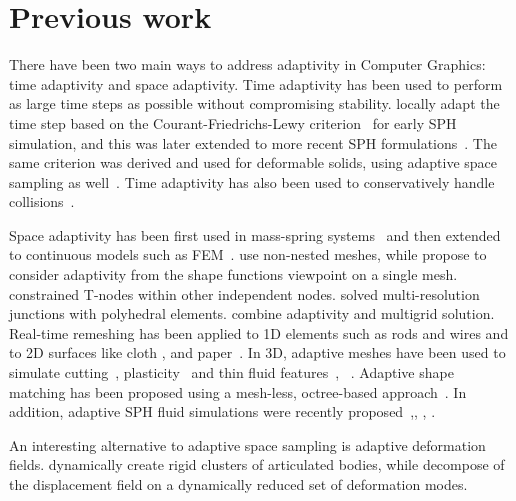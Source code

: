 \documentclass[11pt, oneside, a4paper]{memoir}
\begin{document}
\section{Previous work}
There have been two main ways to address adaptivity in Computer Graphics: time adaptivity and space adaptivity.
Time adaptivity has been used to perform as large time steps as possible without compromising stability. \cite{Desbrun:1996:SPN} locally adapt the time step based on the Courant-Friedrichs-Lewy criterion~\cite{Press:1992:NRC:148286} for early SPH simulation, and this was later extended to more recent SPH formulations~\cite{Bender_boundaryhandling}. The same criterion was derived and used for deformable solids, using adaptive space sampling as well~\cite{DDBC99,DDCB01}.
Time adaptivity has also been used to conservatively handle collisions~\cite{Harmon:2009:ACM}.

Space adaptivity has been first used in mass-spring systems~\cite{Hutchinson97AdaptiveMassspring,ganovelli99multires} and then extended to continuous models such as FEM~\cite{wu01adaptive}.
\cite{DDCB01} use non-nested meshes, while \cite{CHARMS} propose to consider adaptivity from the shape functions viewpoint on a single mesh. %
\cite{Sifakisy:hybrid:2007} constrained T-nodes within other independent nodes.
\cite{Martin:PolyhedralFEM:2008} solved multi-resolution junctions with polyhedral elements.
\cite{Otaduymultigrid} combine adaptivity and multigrid solution.
Real-time remeshing has been applied to 1D elements such as rods and wires \cite{Lenoir:spline:2005,Spillmann:rods:08,Lacoursiere:wire:tvcg11} and to 2D surfaces like cloth \cite{BenDeu12}, \cite{Narain:2012:AAR} and paper~\cite{Narain:2013:FCA}.
In 3D, adaptive meshes have been used to simulate cutting~\cite{cotin_hybrid}, plasticity~\cite{Bargteil:2007,Wicke:2010} and thin fluid features~\cite{Wojtan:2008}, ~\cite{Tetflip2013}.
Adaptive shape matching has been proposed using a  mesh-less, octree-based approach~\cite{Steinemann:adaptiveshapematching:2008}.
In addition, adaptive SPH fluid simulations were recently proposed~\cite{Adams:2007:ASP},\cite{Solenthaler:2011:TPS:2010324.1964976}, \cite{Goswami2011}, \cite{Orthmann:2012:TBA:2393476.2393484}.

An interesting alternative to adaptive space sampling is adaptive deformation fields.
\cite{Redon:adaptivearticulated:2005} dynamically create rigid clusters of articulated bodies, while
\cite{Kim:2009:SSD} decompose of the displacement field on a dynamically reduced set of deformation modes.
\end{document}
